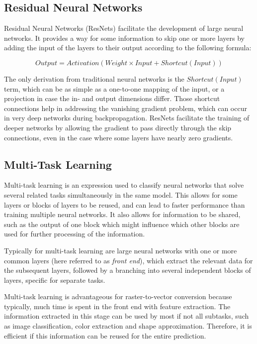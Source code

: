 \documentclass[12pt, a4paper, titlepage]{report}
\begin{document}
\subsection{Residual Neural Networks}

Residual Neural Networks (ResNets) facilitate the development of large neural networks. It provides a way for some information to skip one or more layers by adding the input of the layers to their output according to the following formula:

\[
   Output = Activation\left( Weight \times Input + Shortcut(Input) \right)
\]

The only derivation from traditional neural networks is the $Shortcut(Input)$ term, which can be as simple as a one-to-one mapping of the input, or a projection in case the in- and output dimensions differ. Those shortcut connections help in addressing the vanishing gradient problem, which can occur in very deep networks during backpropagation. ResNets facilitate the training of deeper networks by allowing the gradient to pass directly through the skip connections, even in the case where some layers have nearly zero gradients.

\subsection{Multi-Task Learning}

Multi-task learning is an expression used to classify neural networks that solve several related tasks simultaneously in the same model. This allows for some layers or blocks of layers to be reused, and can lead to faster performance than training multiple neural networks. It also allows for information to be shared, such as the output of one block which might influence which other blocks are used for further processing of the information.

Typically for multi-task learning are large neural networks with one or more common layers (here referred to as \emph{front end}), which extract the relevant data for the subsequent layers, followed by a branching into several independent blocks of layers, specific for separate tasks.

Multi-task learning is advantageous for raster-to-vector conversion because typically, much time is spent in the front end with feature extraction. The information extracted in this stage can be used by most if not all subtasks, such as image classification, color extraction and shape approximation. Therefore, it is efficient if this information can be reused for the entire prediction.
\end{document}
